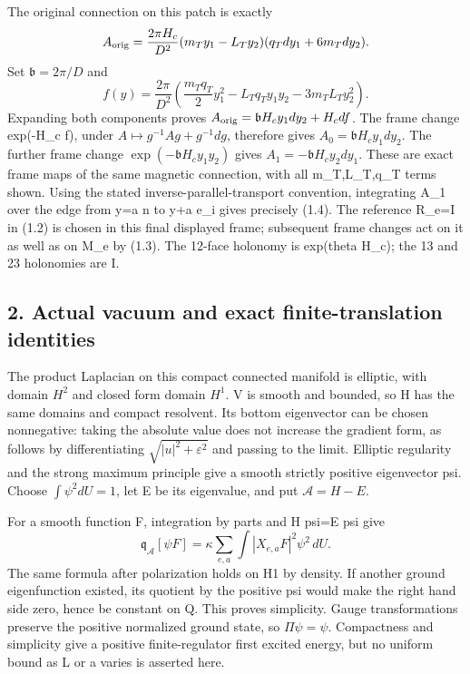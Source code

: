 \documentclass[
  11pt,
]{article}
\begin{document}
The original connection on this patch is exactly \[
 A_{\rm orig}=\frac{2\pi H_c}{D^2}
 (m_Ty_1-L_Ty_2)(q_Tdy_1+6m_Tdy_2).
\] Set \(\mathfrak b=2\pi/D\) and \[
 f(y)=\frac{2\pi}{D^2}
 \left(\frac{m_Tq_T}{2}y_1^2-L_Tq_Ty_1y_2-3m_TL_Ty_2^2\right).
\] Expanding both components proves
\(A_{\rm orig}=\mathfrak bH_c y_1dy_2+H_cdf\). The frame change
exp(-H\_c f), under \(A\mapsto g^{-1}Ag+g^{-1}dg\), therefore gives
\(A_0=\mathfrak bH_c y_1dy_2\). The further frame change
\(\exp(-\mathfrak bH_c y_1y_2)\) gives \(A_1=-\mathfrak bH_c y_2dy_1\).
These are exact frame maps of the same magnetic connection, with all
m\_T,L\_T,q\_T terms shown. Using the stated inverse-parallel-transport
convention, integrating A\_1 over the edge from y=a n to y+a e\_i gives
precisely (1.4). The reference R\_e=I in (1.2) is chosen in this final
displayed frame; subsequent frame changes act on it as well as on M\_e
by (1.3). The 12-face holonomy is exp(theta H\_c); the 13 and 23
holonomies are I.

\subsection{2. Actual vacuum and exact finite-translation
identities}\label{magnetic-part-1-actual-vacuum-and-exact-finite-translation-identities}

The product Laplacian on this compact connected manifold is elliptic,
with domain \(H^2\) and closed form domain \(H^1\). V is smooth and
bounded, so H has the same domains and compact resolvent. Its bottom
eigenvector can be chosen nonnegative: taking the absolute value does
not increase the gradient form, as follows by differentiating
\(\sqrt{|u|^2+\varepsilon^2}\) and passing to the limit. Elliptic
regularity and the strong maximum principle give a smooth strictly
positive eigenvector psi. Choose \(\int\psi^2dU=1\), let E be its
eigenvalue, and put \(\mathcal A=H-E\).

For a smooth function F, integration by parts and H psi=E psi give \[
 \mathfrak q_{\mathcal A}[\psi F]
 =\kappa\sum_{e,a}\int |X_{e,a}F|^2\psi^2\,dU.
\tag{2.1}
\] The same formula after polarization holds on H1 by density. If
another ground eigenfunction existed, its quotient by the positive psi
would make the right hand side zero, hence be constant on Q. This proves
simplicity. Gauge transformations preserve the positive normalized
ground state, so \(\Pi\psi=\psi\). Compactness and simplicity give a
positive finite-regulator first excited energy, but no uniform bound as
L or a varies is asserted here.
\end{document}
